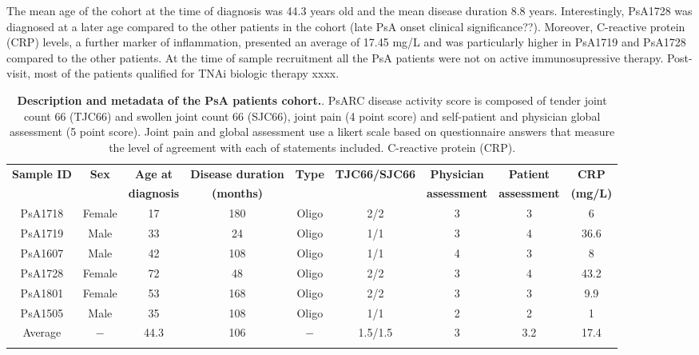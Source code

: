 The mean age of the cohort at the time of diagnosis was 44.3 years old and the mean disease duration 8.8 years. Interestingly, PsA1728 was diagnosed at a later age compared to the other patients in the cohort (late PsA onset clinical significance??). Moreover, C-reactive protein (CRP) levels, a further marker of inflammation, presented an average of 17.45 mg/L and was particularly higher in PsA1719 and PsA1728 compared to the other patients. At the time of sample recruitment all the PsA patients were not on active immunosupressive therapy. Post-visit, most of the patients qualified for TNAi biologic therapy xxxx.


%
\begin{landscape}
\begin{center}
\begin{longtable}[ht]{c c c c c c c c c}
\caption[Description and metadata of the PsA patients cohort.]{\textbf{Description and metadata of the PsA patients cohort.}. PsARC disease activity score is composed of tender joint count 66 (TJC66) and swollen joint count 66 (SJC66), joint pain (4 point score) and self-patient and physician global assessment (5 point score). Joint pain and global assessment use a likert scale based on questionnaire answers that measure the level of agreement with each of statements included. C-reactive protein (CRP).}
\label{tab:PSA_cohort_metadata} \\
\toprule
\textbf{ Sample ID} & \textbf{Sex} & \textbf{Age at} & \textbf{Disease duration} & \textbf{Type} &\textbf{TJC66/SJC66}  & \textbf{Physician } & \textbf{Patient} & \textbf{CRP} \\
                   &               & \textbf{diagnosis} & \textbf{(months)}      &               &                      & \textbf{assessment} & \textbf{assessment}  & \textbf{(mg/L)} \\
\midrule
\midrule
PsA1718 & Female & 17 & 180 & Oligo  & 2/2 & 3 & 3 & 6 \\
PsA1719	& Male &	33 & 24	 & Oligo &	1/1 &	3 & 4 & 36.6 \\           
PsA1607 &	Male & 42 & 108 &	Oligo &	1/1	& 4 & 3 & 8 \\
PsA1728	& Female & 72	& 48 & Oligo & 2/2 & 3 & 4 & 43.2 \\
PsA1801	& Female & 53 & 168 & Oligo & 2/2 &	3 & 3 & 9.9 \\
PsA1505 & Male & 35 &	108 & Oligo & 1/1 & 2 & 2 & 1 \\	
\midrule
Average		& $-$	&	44.3 & 106 & $-$ & 1.5/1.5 & 3 & 3.2 & 17.4 \\																			
\bottomrule
\medskip
\end{longtable}
\end{center}
\end{landscape}

